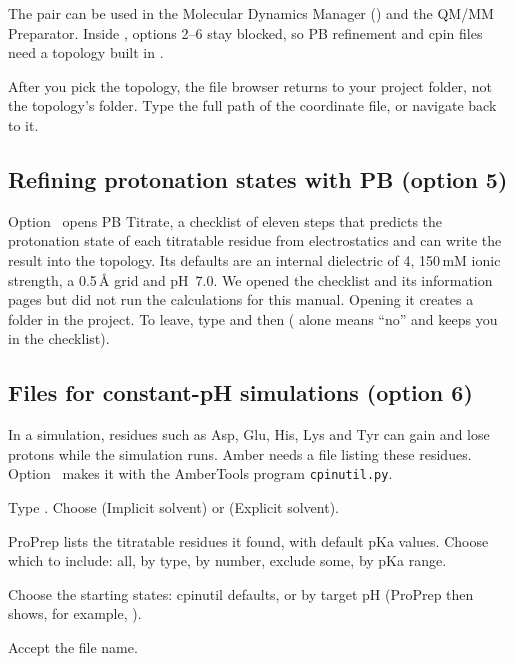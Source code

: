 The pair can be used in the Molecular Dynamics Manager () and the
QM/MM Preparator. Inside , options 2--6 stay blocked, so PB refinement
and cpin files need a topology built in .

\begin{tip}
After you pick the topology, the file browser returns to your project folder,
not the topology's folder. Type the full path of the coordinate file, or
navigate back to it.
\end{tip}

\subsection{Refining protonation states with PB (option 5)}

Option~ opens \textsf{PB Titrate}, a checklist of eleven steps that
predicts the protonation state of each titratable residue from
 electrostatics and can write the result into the
topology. Its defaults are an internal dielectric of 4, 150\,mM ionic
strength, a 0.5\,Å grid and pH~7.0. We opened the checklist and its
information pages but did not run the calculations for this manual.
Opening it creates a folder  in the project. To leave,
type  and then  ( alone means ``no'' and keeps you
in the checklist).

\subsection{Files for constant-pH simulations (option 6)}\label{sec:topology-cpin}

In a  simulation, residues such as Asp, Glu, His, Lys and
Tyr can gain and lose protons while the simulation runs. Amber needs a
 file listing these residues. Option~ makes it with the
AmberTools program \texttt{cpinutil.py}.

\begin{steps}
  \item Type . Choose  (Implicit solvent) or  (Explicit
        solvent).
  \item ProPrep lists the titratable residues it found, with default pKa
        values. Choose which to include:  all,  by type,
         by number,  exclude some,  by pKa range.
  \item Choose the starting states:  cpinutil defaults, or  by
        target pH (ProPrep then shows, for example, ).
  \item Accept the file name.
\end{steps}

